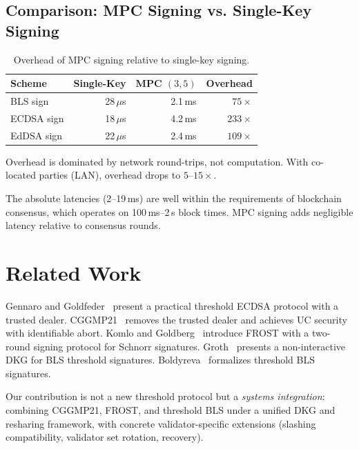 \documentclass[11pt,a4paper]{article}
\begin{document}
\subsection{Comparison: MPC Signing vs. Single-Key Signing}

\begin{table}[ht]
\centering
\caption{Overhead of MPC signing relative to single-key signing.}
\label{tab:overhead}
\begin{tabular}{lrrr}
\toprule
\textbf{Scheme} & \textbf{Single-Key} & \textbf{MPC $(3,5)$} & \textbf{Overhead} \\
\midrule
BLS sign & 28\,$\mu$s & 2.1\,ms & $75\times$ \\
ECDSA sign & 18\,$\mu$s & 4.2\,ms & $233\times$ \\
EdDSA sign & 22\,$\mu$s & 2.4\,ms & $109\times$ \\
\bottomrule
\end{tabular}
\vspace{0.3em}
\footnotesize{Overhead is dominated by network round-trips, not computation.
With co-located parties (LAN), overhead drops to $5\text{--}15\times$.}
\end{table}

The absolute latencies (2--19\,ms) are well within the requirements of blockchain
consensus, which operates on 100\,ms--2\,s block times. MPC signing adds negligible
latency relative to consensus rounds.

\section{Related Work}
\label{sec:related}

Gennaro and Goldfeder~\cite{gennaro2020fast} present a practical threshold ECDSA
protocol with a trusted dealer. CGGMP21~\cite{canetti2021uc} removes the trusted
dealer and achieves UC security with identifiable abort. Komlo and
Goldberg~\cite{komlo2020frost} introduce FROST with a two-round signing protocol
for Schnorr signatures. Groth~\cite{groth2021non} presents a non-interactive DKG
for BLS threshold signatures. Boldyreva~\cite{boldyreva2003threshold} formalizes
threshold BLS signatures.

Our contribution is not a new threshold protocol but a \emph{systems integration}:
combining CGGMP21, FROST, and threshold BLS under a unified DKG and resharing
framework, with concrete validator-specific extensions (slashing compatibility,
validator set rotation, recovery).
\end{document}
